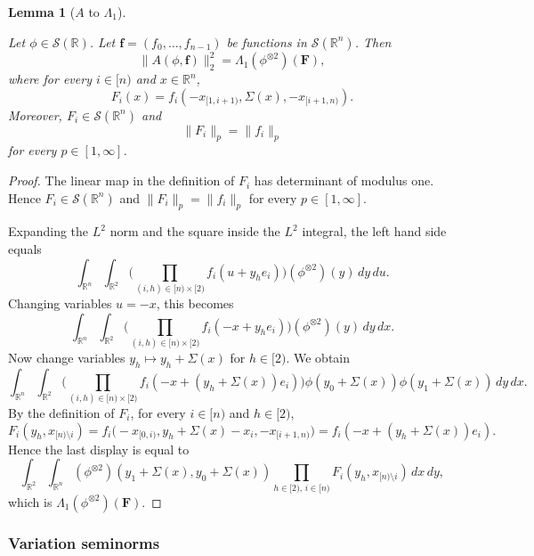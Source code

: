\documentclass[12pt,reqno]{amsart}
\theoremstyle{plain}
\newtheorem{lemma}[theorem]{Lemma}
\numberwithin{equation}{section}
\theoremstyle{remark}
\newcommand{\uses}[1]{}
\newcommand{\usesdefs}[1]{}
\newcommand{\leanok}{}
\newcommand{\lean}[1]{}
\newcommand{\R}{{\mathbb R}}
\begin{document}
\begin{lemma}[$A$ to $\Lambda_1$]\label{A to Lambda}\uses{}\usesdefs{A_def,auto:prism-form-definition}
\lean{Auto.aToLambda}
\leanok
Let $\phi\in \mathcal{S}(\R)$.
Let $\mathbf{f}=(f_0,\dots,f_{n-1})$ be functions in $\mathcal{S}(\R^n)$.
Then
\begin{equation}\label{auto:twisted-average-prism-identity}
\|A(\phi, {\mathbf f})\|_2^2 = \Lambda_1(\phi^{\otimes 2})(\mathbf{F}),
\end{equation}
where for every $i\in[n)$ and $x\in\R^n$,
\begin{equation}\label{auto:twisted-average-coordinate-transform}
F_i(x)=f_i(-x_{[1,i+1)},\Sigma(x),-x_{[i+1,n)}).
\end{equation}
Moreover, $F_i\in\mathcal S(\R^n)$ and
\begin{equation}\label{auto:twisted-average-coordinate-transform-isometry}
\|F_i\|_p=\|f_i\|_p
\end{equation}
for every $p\in[1,\infty]$.
\end{lemma}

\begin{proof}
The linear map in the definition of $F_i$ has determinant of modulus one. Hence $F_i\in\mathcal S(\R^n)$ and $\|F_i\|_p=\|f_i\|_p$ for every $p\in[1,\infty]$.

Expanding the $L^2$ norm and the square inside the $L^2$ integral, the left hand side equals
\[
 \int_{\R^n} \int_{\mathbb{R}^2}
 \Big(\prod_{(i,h)\in [n)\times [2)} f_i(u+y_h e_i) \Big)
 (\phi^{\otimes 2})(y)\, dy\, du .
\]
Changing variables $u=-x$, this becomes
\[
 \int_{\R^n} \int_{\mathbb{R}^2}
 \Big(\prod_{(i,h)\in [n)\times [2)} f_i(-x+y_h e_i) \Big)
 (\phi^{\otimes 2})(y)\, dy\, dx .
\]
Now change variables $y_h\mapsto y_h+\Sigma(x)$ for $h\in[2)$. We obtain
\[
 \int_{\R^n} \int_{\mathbb{R}^2}
 \Big(\prod_{(i,h)\in [n)\times [2)}
 f_i(-x+(y_h+\Sigma(x))e_i) \Big)
 \phi(y_0+\Sigma(x))\phi(y_1+\Sigma(x))\, dy\, dx .
\]
By the definition of $F_i$, for every $i\in[n)$ and $h\in[2)$,
\[
 F_i(y_h,x_{[n)\setminus i})
 =
 f_i\bigl(-x_{[0,i)},y_h+\Sigma(x)-x_i,-x_{[i+1,n)}\bigr)
 =
 f_i(-x+(y_h+\Sigma(x))e_i).
\]
Hence the last display is equal to
\[
 \int_{\R^2}\int_{\R^n}
 (\phi^{\otimes 2})(y_1+\Sigma(x),y_0+\Sigma(x))
 \prod_{h\in[2),\,i\in[n)}
 F_i(y_h,x_{[n)\setminus i})\,dx\,dy ,
\]
which is $\Lambda_1(\phi^{\otimes 2})(\mathbf{F})$.
\end{proof}


\subsubsection{Variation seminorms}\label{sec:variation-norm}
\end{document}
